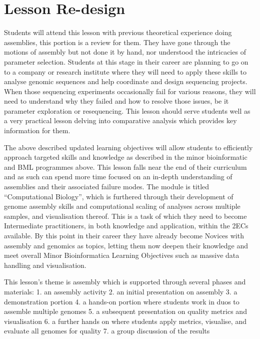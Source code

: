 \documentclass[paper=a4,justified,a4paper]{tufte-handout}
\begin{document}
\hypertarget{lesson-re-design}{%
\section{Lesson Re-design}\label{lesson-re-design}}

Students will attend this lesson with previous theoretical experience
doing assemblies, this portion is a review for them. They have gone
through the motions of assembly but not done it by hand, nor understood
the intricacies of parameter selection. Students at this stage in their
career are planning to go on to a company or research institute where
they will need to apply these skills to analyse genomic sequences and
help coordinate and design sequencing projects. When those sequencing
experiments occasionally fail for various reasons, they will need to
understand why they failed and how to resolve those issues, be it
parameter exploration or resequencing. This lesson should serve students
well as a very practical lesson delving into comparative analysis which
provides key information for them.

The above described updated learning objectives will allow students to
efficiently approach targeted skills and knowledge as described in the
minor bioinformatic and BML programmes above. This lesson falls near the
end of their curriculum and as such can spend more time focused on an
in-depth understanding of assemblies and their associated failure modes.
The module is titled ``Computational Biology'', which is furthered
through their development of genome assembly skills and computational
scaling of analyses across multiple samples, and visualisation thereof.
This is a task of which they need to become Intermediate practitioners,
in both knowledge and application, within the 2ECs available. By this
point in their career they have already become Novices with assembly and
genomics as topics, letting them now deepen their knowledge and meet
overall Minor Bioinformatica Learning Objectives such as massive data
handling and visualisation.

This lesson's theme is assembly which is supported through several
phases and materials: 1. an assembly activity 2. an initial presentation
on assembly 3. a demonstration portion 4. a hands-on portion where
students work in duos to assemble multiple genomes 5. a subsequent
presentation on quality metrics and visualisation 6. a further hands on
where students apply metrics, visualise, and evaluate all genomes for
quality 7. a group discussion of the results
\end{document}
